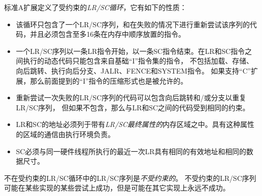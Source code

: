 标准A扩展定义了受约束的{\em LR/SC循环}，它有如下的性质：
\vspace{-0.2in}
\begin{itemize}
\parskip 0pt
\itemsep 1pt
\item 该循环只包含了一个LR/SC序列，和在失败的情况下进行重新尝试该序列的代码，并且必须包含至多16条在内存中顺序放置的指令。 
\item 一个LR/SC序列以一条LR指令开始，以一条SC指令结束。在LR和SC指令之间执行的动态代码只能包含来自基础“I”指令集的指令，
  不包括加载、存储、向后跳转、执行向后分支、JALR、FENCE和SYSTEM指令。
  如果支持“C”扩展，那么前面提到的“I”指令的压缩形式也是被允许的。

\item 重新尝试一次失败的LR/SC序列的代码可以包含向后跳转和/或分支以重复LR/SC序列，
  但如果不包含，那么与LR和SC之间的代码受到相同的约束。
\item LR和SC的地址必须列于带有{\em LR/SC最终属性的}内存区域之中。具有这种属性的区域的通信由执行环境负责。
\item SC必须与同一硬件线程所执行的最近一次LR具有相同的有效地址和相同的数据尺寸。
\end{itemize}

不在受约束的LR/SC循环中的LR/SC序列是{\em 不受约束的}。
不受约束的LR/SC序列可能在某些实现的某些尝试上成功，但是可能在其它实现上永远不成功。

